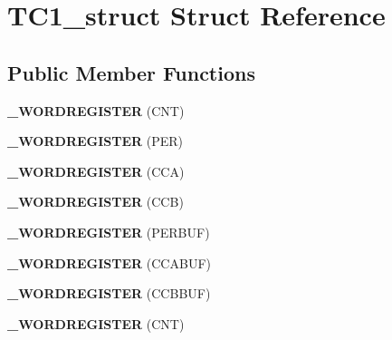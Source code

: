 \hypertarget{struct_t_c1__struct}{}\section{T\+C1\+\_\+struct Struct Reference}
\label{struct_t_c1__struct}
\subsection*{Public Member Functions}
\begin{DoxyCompactItemize}
\item 
{\bfseries \+\_\+\+W\+O\+R\+D\+R\+E\+G\+I\+S\+T\+ER} (C\+NT)\hypertarget{struct_t_c1__struct_a56a4a694e8d3a5a93031d4079e5029a6}{}\label{struct_t_c1__struct_a56a4a694e8d3a5a93031d4079e5029a6}

\item 
{\bfseries \+\_\+\+W\+O\+R\+D\+R\+E\+G\+I\+S\+T\+ER} (P\+ER)\hypertarget{struct_t_c1__struct_afc677a4de3554dbbc4855b5dec5b25d7}{}\label{struct_t_c1__struct_afc677a4de3554dbbc4855b5dec5b25d7}

\item 
{\bfseries \+\_\+\+W\+O\+R\+D\+R\+E\+G\+I\+S\+T\+ER} (C\+CA)\hypertarget{struct_t_c1__struct_abd40344150dc1e480b14e991c0659a9e}{}\label{struct_t_c1__struct_abd40344150dc1e480b14e991c0659a9e}

\item 
{\bfseries \+\_\+\+W\+O\+R\+D\+R\+E\+G\+I\+S\+T\+ER} (C\+CB)\hypertarget{struct_t_c1__struct_a501a06fcb0ab370a90303282122ea8c4}{}\label{struct_t_c1__struct_a501a06fcb0ab370a90303282122ea8c4}

\item 
{\bfseries \+\_\+\+W\+O\+R\+D\+R\+E\+G\+I\+S\+T\+ER} (P\+E\+R\+B\+UF)\hypertarget{struct_t_c1__struct_a5d7f8b5d159e3509deda5d83e306172d}{}\label{struct_t_c1__struct_a5d7f8b5d159e3509deda5d83e306172d}

\item 
{\bfseries \+\_\+\+W\+O\+R\+D\+R\+E\+G\+I\+S\+T\+ER} (C\+C\+A\+B\+UF)\hypertarget{struct_t_c1__struct_add2485c86d0750a9d17603d69724cac4}{}\label{struct_t_c1__struct_add2485c86d0750a9d17603d69724cac4}

\item 
{\bfseries \+\_\+\+W\+O\+R\+D\+R\+E\+G\+I\+S\+T\+ER} (C\+C\+B\+B\+UF)\hypertarget{struct_t_c1__struct_ae2d3bc25815b7a7fdcffab11205c5da8}{}\label{struct_t_c1__struct_ae2d3bc25815b7a7fdcffab11205c5da8}

\item 
{\bfseries \+\_\+\+W\+O\+R\+D\+R\+E\+G\+I\+S\+T\+ER} (C\+NT)\hypertarget{struct_t_c1__struct_a56a4a694e8d3a5a93031d4079e5029a6}{}\label{struct_t_c1__struct_a56a4a694e8d3a5a93031d4079e5029a6}


\end{DoxyCompactItemize}
